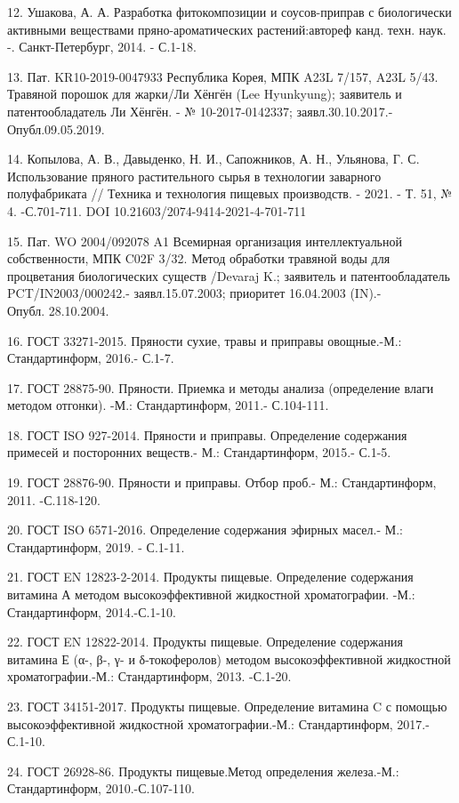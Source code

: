 \begin{references}
12. Ушакова, А. А. Разработка фитокомпозиции и соусов-приправ с
биологически активными веществами пряно-ароматических растений:автореф
канд. техн. наук. -. Санкт-Петербург, 2014. - С.1-18.

13. Пат. KR10-2019-0047933 Республика Корея, МПК A23L 7/157, A23L 5/43.
Травяной порошок для жарки/Ли Хёнгён (Lee Hyunkyung); заявитель и
патентообладатель Ли Хёнгён. - № 10-2017-0142337; заявл.30.10.2017.-
Опубл.09.05.2019.

14. Копылова, А. В., Давыденко, Н. И., Сапожников, А. Н., Ульянова, Г. С.
Использование пряного растительного сырья в технологии заварного
полуфабриката // Техника и технология пищевых производств. - 2021. - Т.
51, № 4. -С.701-711. DOI 10.21603/2074-9414-2021-4-701-711

15. Пат. WO 2004/092078 A1 Всемирная организация интеллектуальной
собственности, МПК C02F 3/32. Метод обработки травяной воды для
процветания биологических существ /Devaraj K.; заявитель и
патентообладатель PCT/IN2003/000242.- заявл.15.07.2003; приоритет
16.04.2003 (IN).- \\Опубл. 28.10.2004.

16. ГОСТ 33271-2015. Пряности сухие, травы и приправы овощные.-М.:
Стандартинформ, 2016.- С.1-7.

17. ГОСТ 28875-90. Пряности. Приемка и методы анализа (определение влаги
методом отгонки). -М.: Стандартинформ, 2011.- С.104-111.

18. ГОСТ ISO 927-2014. Пряности и приправы. Определение содержания
примесей и посторонних веществ.- М.: Стандартинформ, 2015.- С.1-5.

19. ГОСТ 28876-90. Пряности и приправы. Отбор проб.- М.: Стандартинформ,
2011. -С.118-120.

20. ГОСТ ISO 6571-2016. Определение содержания эфирных масел.- М.:
Стандартинформ, 2019. - С.1-11.

21. ГОСТ EN 12823-2-2014. Продукты пищевые. Определение содержания
витамина А методом высокоэффективной жидкостной хроматографии. -М.:
Стандартинформ, 2014.-С.1-10.

22. ГОСТ EN 12822-2014. Продукты пищевые. Определение содержания витамина
Е (α-, β-, γ- и δ-токоферолов) методом высокоэффективной жидкостной
хроматографии.-М.: Стандартинформ, 2013. -С.1-20.

23. ГОСТ 34151-2017. Продукты пищевые. Определение витамина C с помощью
высокоэффективной жидкостной хроматографии.-М.: Стандартинформ, 2017.-
С.1-10.

24. ГОСТ 26928-86. Продукты пищевые.Метод определения железа.-М.:
Стандартинформ, 2010.-С.107-110.


\end{references}
